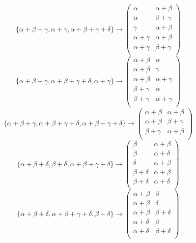 \documentclass[12pt]{article}
\begin{document}
$$
\{\alpha +\beta +\gamma ,\alpha +\gamma ,\alpha +\beta +\gamma +\delta \}\to \left(
\begin{array}{cc}
 \alpha  & \alpha +\beta  \\
 \alpha  & \beta +\gamma  \\
 \gamma  & \alpha +\beta  \\
 \alpha +\gamma  & \alpha +\beta  \\
 \alpha +\gamma  & \beta +\gamma  \\
\end{array}
\right)
$$
$$
\{\alpha +\beta +\gamma ,\alpha +\beta +\gamma +\delta ,\alpha +\gamma \}\to \left(
\begin{array}{cc}
 \alpha +\beta  & \alpha  \\
 \alpha +\beta  & \gamma  \\
 \alpha +\beta  & \alpha +\gamma  \\
 \beta +\gamma  & \alpha  \\
 \beta +\gamma  & \alpha +\gamma  \\
\end{array}
\right)
$$
$$
\{\alpha +\beta +\gamma ,\alpha +\beta +\gamma +\delta ,\alpha +\beta +\gamma +\delta \}\to \left(
\begin{array}{cc}
 \alpha +\beta  & \alpha +\beta  \\
 \alpha +\beta  & \beta +\gamma  \\
 \beta +\gamma  & \alpha +\beta  \\
\end{array}
\right)
$$
$$
\{\alpha +\beta +\delta ,\beta +\delta ,\alpha +\beta +\gamma +\delta \}\to \left(
\begin{array}{cc}
 \beta  & \alpha +\beta  \\
 \beta  & \alpha +\delta  \\
 \delta  & \alpha +\beta  \\
 \beta +\delta  & \alpha +\beta  \\
 \beta +\delta  & \alpha +\delta  \\
\end{array}
\right)
$$
$$
\{\alpha +\beta +\delta ,\alpha +\beta +\gamma +\delta ,\beta +\delta \}\to \left(
\begin{array}{cc}
 \alpha +\beta  & \beta  \\
 \alpha +\beta  & \delta  \\
 \alpha +\beta  & \beta +\delta  \\
 \alpha +\delta  & \beta  \\
 \alpha +\delta  & \beta +\delta  \\
\end{array}
\right)
$$
\end{document}
